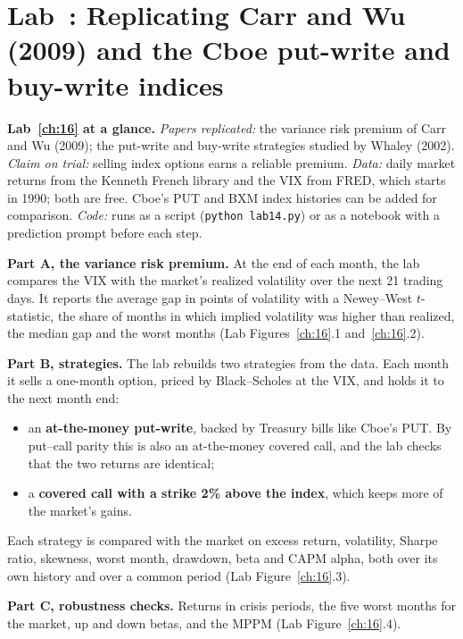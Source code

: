 \section{Lab~\thechapter: Replicating Carr and Wu (2009) and the Cboe put-write and buy-write indices}
\label{sec:16-lab}

\begin{callout}
\textbf{Lab~\ref{ch:16} at a glance.} \emph{Papers replicated:} the variance risk premium of Carr and Wu (2009); the put-write and buy-write strategies studied by Whaley (2002). \emph{Claim on trial:} selling index options earns a reliable premium. \emph{Data:} daily market returns from the Kenneth French library and the VIX from FRED, which starts in 1990; both are free. Cboe's PUT and BXM index histories can be added for comparison. \emph{Code:} runs as a script (\texttt{python lab14.py}) or as a notebook with a prediction prompt before each step.
\end{callout}

\textbf{Part A, the variance risk premium.} At the end of each month, the lab compares the VIX with the market's realized volatility over the next 21 trading days. It reports the average gap in points of volatility with a Newey--West $t$-statistic, the share of months in which implied volatility was higher than realized, the median gap and the worst months (Lab Figures~\ref{ch:16}.1 and~\ref{ch:16}.2).

\textbf{Part B, strategies.} The lab rebuilds two strategies from the data. Each month it sells a one-month option, priced by Black--Scholes at the VIX, and holds it to the next month end:

\begin{itemize}
  \item an \textbf{at-the-money put-write}, backed by Treasury bills like Cboe's PUT. By put--call parity this is also an at-the-money covered call, and the lab checks that the two returns are identical;
  \item a \textbf{covered call with a strike 2\% above the index}, which keeps more of the market's gains.
\end{itemize}

Each strategy is compared with the market on excess return, volatility, Sharpe ratio, skewness, worst month, drawdown, beta and CAPM alpha, both over its own history and over a common period (Lab Figure~\ref{ch:16}.3).

\textbf{Part C, robustness checks.} Returns in crisis periods, the five worst months for the market, up and down betas, and the MPPM (Lab Figure~\ref{ch:16}.4).

